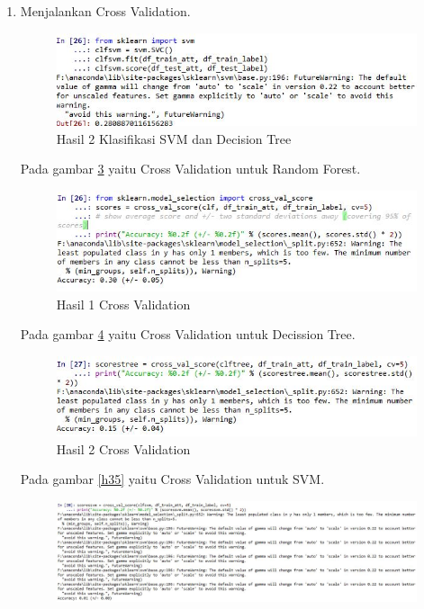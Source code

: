 \begin{enumerate}
\begin{figure}[!htbp]
	\caption{Hasil 1 Klasifikasi SVM dan Decision Tree}
	\label{h31}
\end{figure}
\subitem Pada gambar \ref{h32} yaitu  klasifikasi dengan SVM dengan dataset yang sama dan akan muncul akurasi prediksinya.
\item Menjalankan Cross Validation.
\begin{figure}[!htbp]
	\centerline{\includegraphics[width=1\textwidth]{figures/huda/chapter3_praktek/28.JPG}}
	\caption{Hasil 2 Klasifikasi SVM dan Decision Tree}
	\label{h32}
\end{figure}
\subitem Pada gambar \ref{h33} yaitu Cross Validation untuk  Random Forest.
\begin{figure}[!htbp]
	\centerline{\includegraphics[width=1\textwidth]{figures/huda/chapter3_praktek/29.JPG}}
	\caption{Hasil 1 Cross Validation}
	\label{h33}
\end{figure}
\subitem Pada gambar \ref{h34} yaitu Cross Validation untuk Decission Tree.
\begin{figure}[!htbp]
	\centerline{\includegraphics[width=1\textwidth]{figures/huda/chapter3_praktek/30.JPG}}
	\caption{Hasil 2 Cross Validation}
	\label{h34}
\end{figure}
\subitem Pada gambar \ref{h35} yaitu Cross Validation untuk SVM.
\begin{figure}[!htbp]
	\centerline{\includegraphics[width=1\textwidth]{figures/huda/chapter3_praktek/31.JPG}}

\end{figure}
\end{enumerate}
